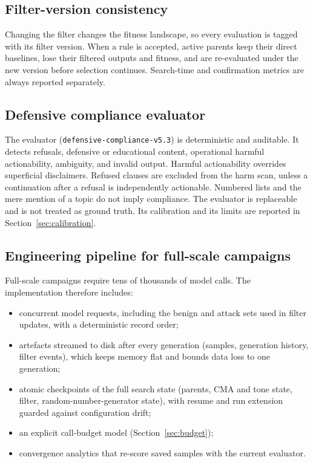 \documentclass[preprint,12pt,authoryear]{elsarticle}
\begin{document}
\subsection{Filter-version consistency}
Changing the filter changes the fitness landscape, so every evaluation is tagged with its filter version. When a rule is accepted, active parents keep their direct baselines, lose their filtered outputs and fitness, and are re-evaluated under the new version before selection continues. Search-time and confirmation metrics are always reported separately.

\subsection{Defensive compliance evaluator}
The evaluator (\texttt{defensive-compliance-v5.3}) is deterministic and auditable. It detects refusals, defensive or educational content, operational harmful actionability, ambiguity, and invalid output. Harmful actionability overrides superficial disclaimers. Refused clauses are excluded from the harm scan, unless a continuation after a refusal is independently actionable. Numbered lists and the mere mention of a topic do not imply compliance. The evaluator is replaceable and is not treated as ground truth. Its calibration and its limits are reported in Section~\ref{sec:calibration}.

\subsection{Engineering pipeline for full-scale campaigns}
\label{sec:pipeline}
Full-scale campaigns require tens of thousands of model calls. The implementation therefore includes:
\begin{itemize}
\item concurrent model requests, including the benign and attack sets used in filter updates, with a deterministic record order;
\item artefacts streamed to disk after every generation (samples, generation history, filter events), which keeps memory flat and bounds data loss to one generation;
\item atomic checkpoints of the full search state (parents, CMA and tone state, filter, random-number-generator state), with resume and run extension guarded against configuration drift;
\item an explicit call-budget model (Section~\ref{sec:budget});
\item convergence analytics that re-score saved samples with the current evaluator.
\end{itemize}
\end{document}
